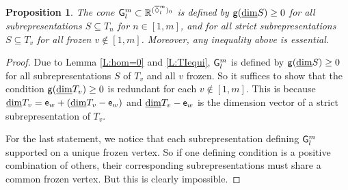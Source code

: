 \documentclass{amsart}
\newtheorem{proposition}[theorem]{Proposition}
\theoremstyle{definition}
\theoremstyle{remark}
\numberwithin{equation}{section}
\newcommand{\mb}[1]{\mathbb{#1}}
\newcommand{\mr}[1]{{\sf #1}}%
\newcommand{\br}[1]{\overline{#1}}
\newcommand{\dv}{\underline{\dim}}
\newcommand{\e}{{\sf e}}
\newcommand{\g}{{\sf g}}
\begin{document}
\begin{proposition} \label{P:Glm} The cone $\mr{G}_l^m \subset \mb{R}^{(\br{\Diamond}_l^m)_0}$ is defined by $\g(\dv S)\geq 0$ for all subrepresentations $S\subseteq T_n$ for $n\in[1,m]$, and for all strict subrepresentations $S\subseteq T_v$ for all frozen $v\notin[1,m]$. 
	Moreover, any inequality above is essential.
\end{proposition}

\begin{proof} Due to Lemma \ref{L:hom=0} and \ref{L:TIequi}, $\mr{G}_l^m$ is defined by $\g(\dv S)\geq 0$ for all subrepresentations $S$ of $T_v$ and all $v$ frozen.
So it suffices to show that the condition $\g(\dv T_v)\geq 0$ is redundant for each $v\notin[1,m]$.
This is because $\dv T_v = \e_w + (\dv T_v-\e_w)$ and $\dv T_v-\e_w$ is the dimension vector of a strict subrepresentation of $T_v$.

For the last statement, we notice that each subrepresentation defining $\mr{G}_l^m$ supported on a unique frozen vertex. 
So if one defining condition is a positive combination of others, their corresponding subrepresentations must share a common frozen vertex. But this is clearly impossible.
\end{proof}
\end{document}
